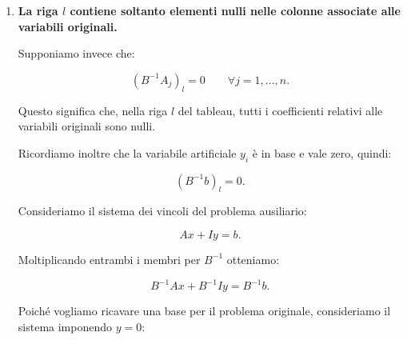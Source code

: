 \begin{enumerate}
    Ricordiamo che, prima del pivot, il termine noto della riga $l$ è nullo:

    \[
    (B^{-1}b)_l=0.
    \]

    Durante le operazioni di pivot, la riga $l$ viene divisa per un numero non nullo. Il suo termine noto rimane quindi zero.

    Inoltre, quando utilizziamo questa riga per annullare gli altri coefficienti della colonna entrante, tutti gli altri termini noti rimangono invariati, poiché stiamo sottraendo multipli di una riga avente termine noto nullo.

    Di conseguenza:

    \[
    \boxed{x_1^{\mathrm{nuova}}=0}
    \]

    e i valori delle altre variabili di base rimangono invariati.

    Quindi, \textbf{la soluzione ammissibile rappresentata dal tableau non cambia: cambia soltanto la base utilizzata per rappresentarla}.

    Questo procedimento prende il nome di \textbf{pivot degenere}, poiché la variabile entrante assume valore zero.

    Osserviamo inoltre che, in questo particolare procedimento, è sufficiente scegliere un elemento pivot non nullo, anche negativo, perché non stiamo effettuando uno spostamento verso una soluzione diversa.

    \item \textbf{La riga $l$ contiene soltanto elementi nulli nelle colonne associate alle variabili originali.}

    Supponiamo invece che:

    \[
    (B^{-1}A_j)_l=0
    \qquad
    \forall j=1,\ldots,n.
    \]

    Questo significa che, nella riga $l$ del tableau, tutti i coefficienti relativi alle variabili originali sono nulli.

    Ricordiamo inoltre che la variabile artificiale $y_i$ è in base e vale zero, quindi:

    \[
    (B^{-1}b)_l=0.
    \]

    Consideriamo il sistema dei vincoli del problema ausiliario:

    \[
    Ax+Iy=b.
    \]

    Moltiplicando entrambi i membri per $B^{-1}$ otteniamo:

    \[
    B^{-1}Ax+B^{-1}Iy=B^{-1}b.
    \]

    Poiché vogliamo ricavare una base per il problema originale, consideriamo il sistema imponendo $y=0$:


\end{enumerate}
